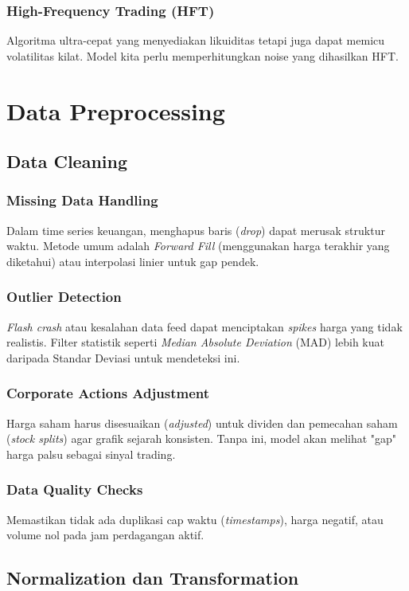 \documentclass[12pt,a4paper]{book}
\begin{document}
\subsection{High-Frequency Trading (HFT)}
Algoritma ultra-cepat yang menyediakan likuiditas tetapi juga dapat memicu volatilitas kilat. Model kita perlu memperhitungkan noise yang dihasilkan HFT.

\chapter{Data Preprocessing}
\section{Data Cleaning}
\subsection{Missing Data Handling}
Dalam time series keuangan, menghapus baris (\textit{drop}) dapat merusak struktur waktu. Metode umum adalah \textit{Forward Fill} (menggunakan harga terakhir yang diketahui) atau interpolasi linier untuk gap pendek.

\subsection{Outlier Detection}
\textit{Flash crash} atau kesalahan data feed dapat menciptakan \textit{spikes} harga yang tidak realistis. Filter statistik seperti \textit{Median Absolute Deviation} (MAD) lebih kuat daripada Standar Deviasi untuk mendeteksi ini.

\subsection{Corporate Actions Adjustment}
Harga saham harus disesuaikan (\textit{adjusted}) untuk dividen dan pemecahan saham (\textit{stock splits}) agar grafik sejarah konsisten. Tanpa ini, model akan melihat "gap" harga palsu sebagai sinyal trading.

\subsection{Data Quality Checks}
Memastikan tidak ada duplikasi cap waktu (\textit{timestamps}), harga negatif, atau volume nol pada jam perdagangan aktif.

\section{Normalization dan Transformation}
\end{document}

